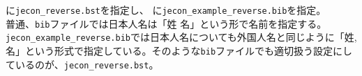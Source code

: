 \documentclass[10pt]{jarticle}
\begin{document}
\verb||に\verb|jecon_reverse.bst|を指定し、
\verb||に\verb|jecon_example_reverse.bib|を指定。
\vspace{1em}\\
普通、\verb|bib|ファイルでは日本人名は「姓 名」という形で名前を指定する。
\verb|jecon_example_reverse.bib|では日本人名についても外国人名と同じように「姓,
名」という形式で指定している。そのような\verb|bib|ファイルでも適切扱う設定にしているのが、\verb|jecon_reverse.bst|。
\vspace{1em}\\



\nocite{*}


% 


\end{document}
